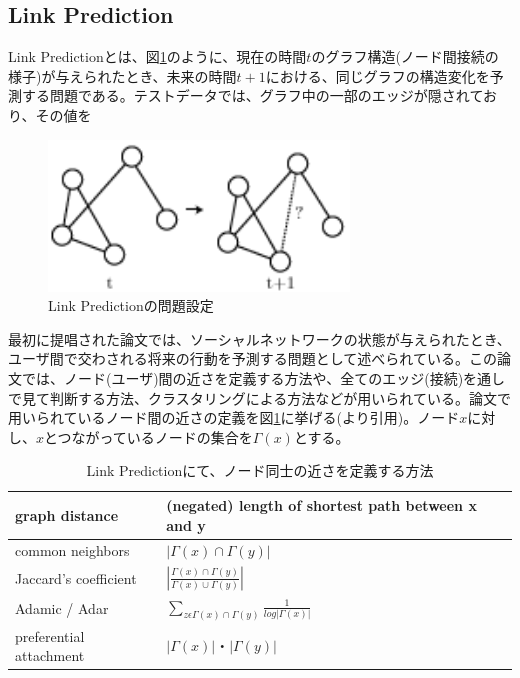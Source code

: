 \subsection{Link Prediction}
Link Predictionとは、図\ref{c2_link_prediction}のように、現在の時間$t$のグラフ構造(ノード間接続の様子)が与えられたとき、未来の時間$t+1$における、同じグラフの構造変化を予測する問題である。テストデータでは、グラフ中の一部のエッジが隠されており、その値を\par
\begin{figure}[tbp]
 \centering
  \includegraphics[width=80mm]{img/c2/link_prediction}
 \caption{Link Predictionの問題設定}
 \label{c2_link_prediction}
\end{figure}
最初に提唱された論文\cite{liben2007link}では、ソーシャルネットワークの状態が与えられたとき、ユーザ間で交わされる将来の行動を予測する問題として述べられている。この論文では、ノード(ユーザ)間の近さを定義する方法や、全てのエッジ(接続)を通しで見て判断する方法、クラスタリングによる方法などが用いられている。論文で用いられているノード間の近さの定義を図\ref{c2_lp_method}に挙げる(\cite{liben2007link}より引用)。ノード$x$に対し、$x$とつながっているノードの集合を$\Gamma(x)$とする。\par
\begin{table}[tbp]
 \begin{center}
  \begin{tabular}{|l|l|}\hline
  graph distance & (negated) length of shortest path between x and y \\ \hline
  common neighbors & $|\Gamma(x)∩\Gamma(y)|$ \\ \hline
  Jaccard's coefficient \cite{jaccard1902lois}& $\left| \frac{\Gamma(x)∩\Gamma(y)}{\Gamma(x)∪\Gamma(y)} \right|$ \\ \hline
  Adamic / Adar \cite{adamic2003friends}& $\sum_{z\epsilon \Gamma(x)∩\Gamma(y)} \frac{1}{log|\Gamma(x)|}$ \\ \hline
  preferential attachment & $|\Gamma(x)|・|\Gamma(y)|$ \\ \hline
  \end{tabular}
 \end{center}
 \caption{Link Predictionにて、ノード同士の近さを定義する方法}
 \label{c2_lp_method}
\end{table}

